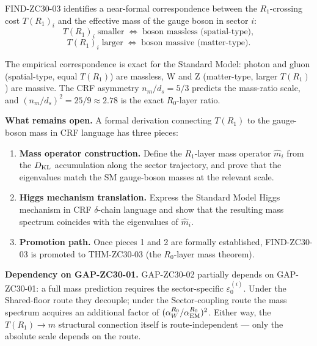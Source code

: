 \documentclass[12pt, a4paper]{article}
\begin{document}
\begin{openqbox}[title={GAP-ZC30-02: Formal $T(R_1) \to m$
  Connection (NEW v17.6 patch, High Priority)}]
FIND-ZC30-03 identifies a near-formal correspondence between
the $R_1$-crossing cost $T(R_1)_i$ and the effective mass of
the gauge boson in sector $i$:
\[
  T(R_1)_i \;\text{smaller}\;\Longleftrightarrow\;
  \text{boson massless (spatial-type)},
\]
\[
  T(R_1)_i \;\text{larger}\;\Longleftrightarrow\;
  \text{boson massive (matter-type)}.
\]

The empirical correspondence is exact for the Standard Model:
photon and gluon (spatial-type, equal $T(R_1)$) are massless,
W and Z (matter-type, larger $T(R_1)$) are massive. The CRF
asymmetry $n_m/d_s = 5/3$ predicts the mass-ratio scale, and
$(n_m/d_s)^2 = 25/9 \approx 2.78$ is the exact $R_0$-layer ratio.

\textbf{What remains open.}
A formal derivation connecting $T(R_1)$ to the gauge-boson mass
in CRF language has three pieces:
\begin{enumerate}[leftmargin=*, noitemsep]
  \item \textbf{Mass operator construction.}
    Define the $R_1$-layer mass operator $\hat{m}_i$ from the
    $D_{\rm KL}$ accumulation along the sector trajectory, and
    prove that the eigenvalues match the SM gauge-boson masses
    at the relevant scale.
  \item \textbf{Higgs mechanism translation.}
    Express the Standard Model Higgs mechanism in CRF
    $\delta$-chain language and show that the resulting mass
    spectrum coincides with the eigenvalues of $\hat{m}_i$.
  \item \textbf{Promotion path.}
    Once pieces 1 and 2 are formally established, FIND-ZC30-03
    is promoted to THM-ZC30-03 (the $R_0$-layer mass theorem).
\end{enumerate}

\textbf{Dependency on GAP-ZC30-01.}
GAP-ZC30-02 partially depends on GAP-ZC30-01: a full mass
prediction requires the sector-specific $\varepsilon_0^{(i)}$.
Under the Shared-floor route they decouple; under the
Sector-coupling route the mass spectrum acquires an additional
factor of $(\alpha_W^{R_0}/\alpha_{\rm EM}^{R_0})^2$. Either way,
the $T(R_1) \to m$ structural connection itself is route-independent
--- only the absolute scale depends on the route.


\end{openqbox}
\end{document}
